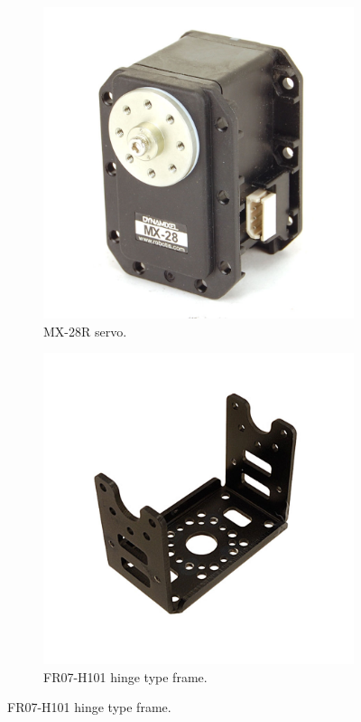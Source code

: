 \begin{figure}[htp]
\centering
    \begin{subfigure}[b]{0.48\textwidth}
    \center
    \includegraphics[width = \textwidth]{figures/mx28}
    \caption{MX-28R servo. \label{fig:mx28}}
    \end{subfigure}
    \hfill
    \begin{subfigure}[b]{0.48\textwidth}
    \centering
    \includegraphics[width = \textwidth]{figures/fr07-h101}
    \caption{FR07-H101 hinge type frame. \label{fig:fr07-h101}}
    \end{subfigure}


\end{figure}
